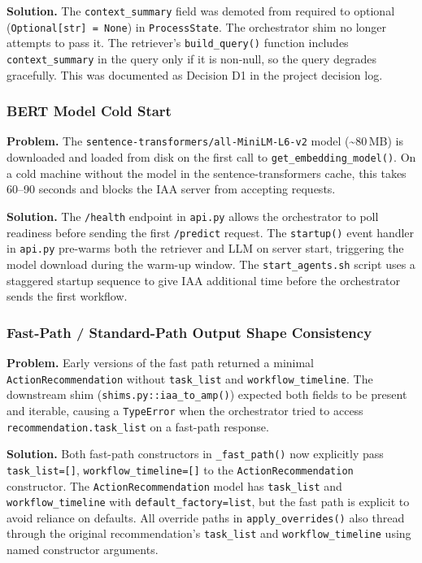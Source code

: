 \documentclass[12pt,a4paper]{article}
\begin{document}
\textbf{Solution.} The \texttt{context\_summary} field was demoted from required to
optional (\texttt{Optional[str] = None}) in \texttt{ProcessState}. The orchestrator
shim no longer attempts to pass it. The retriever's \texttt{build\_query()} function
includes \texttt{context\_summary} in the query only if it is non-null, so the query
degrades gracefully. This was documented as Decision D1 in the project decision log.

\subsubsection{BERT Model Cold Start}

\textbf{Problem.} The \texttt{sentence-transformers/all-MiniLM-L6-v2} model
(\textasciitilde{}80\,MB) is downloaded and loaded from disk on the first call to
\texttt{get\_embedding\_model()}. On a cold machine without the model in the
sentence-transformers cache, this takes 60--90 seconds and blocks the IAA server
from accepting requests.

\textbf{Solution.} The \texttt{/health} endpoint in \texttt{api.py} allows the
orchestrator to poll readiness before sending the first \texttt{/predict} request.
The \texttt{startup()} event handler in \texttt{api.py} pre-warms both the retriever
and LLM on server start, triggering the model download during the warm-up window.
The \texttt{start\_agents.sh} script uses a staggered startup sequence to give IAA
additional time before the orchestrator sends the first workflow.

\subsubsection{Fast-Path / Standard-Path Output Shape Consistency}

\textbf{Problem.} Early versions of the fast path returned a minimal
\texttt{ActionRecommendation} without \texttt{task\_list} and \texttt{workflow\_timeline}.
The downstream shim (\texttt{shims.py::iaa\_to\_amp()}) expected both fields to be
present and iterable, causing a \texttt{TypeError} when the orchestrator tried to
access \texttt{recommendation.task\_list} on a fast-path response.

\textbf{Solution.} Both fast-path constructors in \texttt{\_fast\_path()} now
explicitly pass \texttt{task\_list=[]}, \texttt{workflow\_timeline=[]} to the
\texttt{ActionRecommendation} constructor. The \texttt{ActionRecommendation} model
has \texttt{task\_list} and \texttt{workflow\_timeline} with \texttt{default\_factory=list},
but the fast path is explicit to avoid reliance on defaults. All override paths in
\texttt{apply\_overrides()} also thread through the original recommendation's
\texttt{task\_list} and \texttt{workflow\_timeline} using named constructor arguments.
\end{document}
